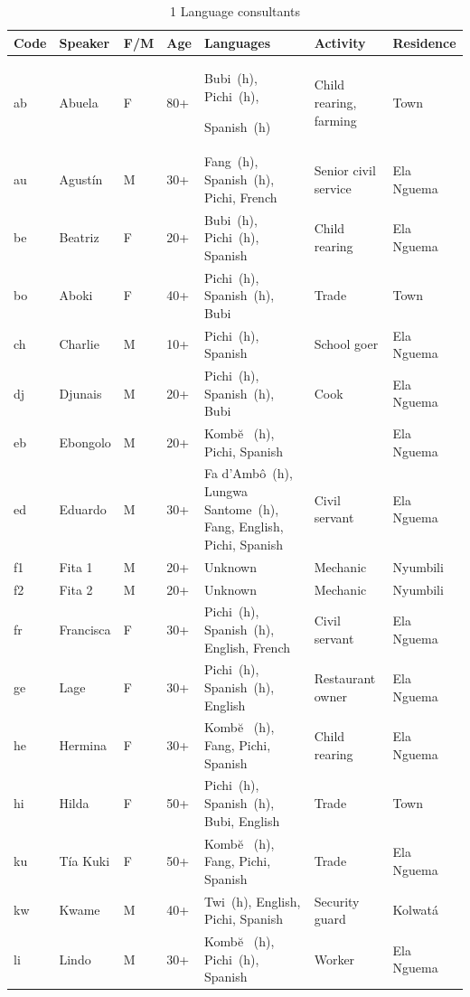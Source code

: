 \begin{longtable}{>{\footnotesize}l@{~}>{\footnotesize}l@{~} >{\footnotesize}l@{~}>{\footnotesize}l >{\footnotesize\raggedright}p{3cm} >{\footnotesize\raggedright}p{2cm} >{\footnotesize}l}
\caption{1 Language consultants}\label{tab:key:1.1}
\\
\lsptoprule

Code & Speaker & F/M & Age & Languages & Activity & Residence\\
\midrule\endhead
ab & Abuela & \textsc{F} & 80+ & Bubi~(h), Pichi~(h), 

Spanish~(h) & Child rearing, farming & Town\\
au & Agustín & M & 30+ & Fang~(h), Spanish~(h), Pichi, French & Senior civil service & Ela Nguema\\
be & Beatriz & \textsc{F} & 20+ & Bubi~(h), Pichi~(h), Spanish & Child rearing & Ela Nguema\\
bo & Aboki & \textsc{F} & 40+ & Pichi~(h), Spanish~(h), Bubi & Trade & Town\\
ch & Charlie & M & 10+ & Pichi~(h), Spanish & School goer & Ela Nguema\\
dj & Djunais & M & 20+ & Pichi~(h), Spanish~(h), Bubi & Cook & Ela Nguema\\
eb & Ebongolo & M & 20+ & Kombe\u{} ~(h), Pichi, Spanish &  & Ela Nguema\\
ed & Eduardo & M & 30+ & Fa d’Ambô~(h), Lungwa Santome~(h), Fang, English, Pichi, Spanish & Civil servant & Ela Nguema\\
f1 & Fita 1 & M & 20+ & Unknown & Mechanic & Nyumbili\\
f2 & Fita 2 & M & 20+ & Unknown & Mechanic & Nyumbili\\
fr & Francisca & \textsc{F} & 30+ & Pichi~(h), Spanish~(h), English, French & Civil servant & Ela Nguema\\
ge & Lage & \textsc{F} & 30+ & Pichi~(h), Spanish~(h), English & Restaurant owner & Ela Nguema\\
he & Hermina & \textsc{F} & 30+ & Kombe\u{} ~(h), Fang, Pichi, Spanish & Child rearing & Ela Nguema\\
hi & Hilda & \textsc{F} & 50+ & Pichi~(h), Spanish~(h), Bubi, English & Trade & Town\\
ku & Tía Kuki & \textsc{F} & 50+ & Kombe\u{} ~(h), Fang, Pichi, Spanish & Trade & Ela Nguema\\
kw & Kwame & M & 40+ & Twi~(h), English, Pichi, Spanish & Security guard & Kolwatá\\
li & Lindo & M & 30+ & Kombe\u{} ~(h), Pichi~(h), Spanish & Worker & Ela Nguema\\

\end{longtable}
